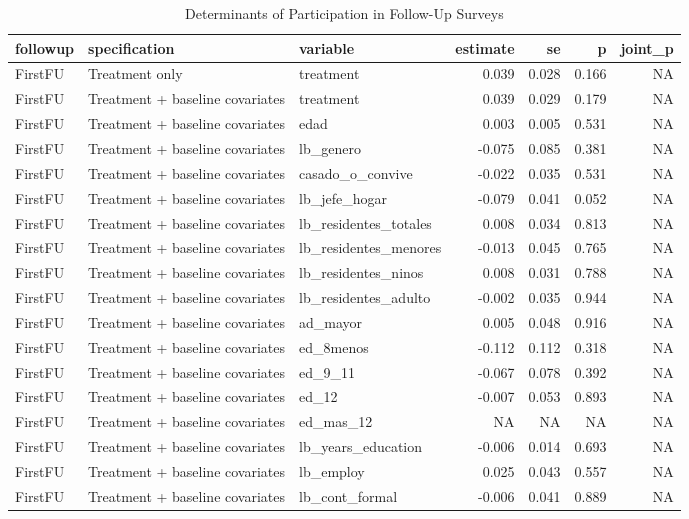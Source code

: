 \begin{table}

\caption{Determinants of Participation in Follow-Up Surveys}
\centering
\begin{tabular}[t]{lllrrrr}
\toprule
followup & specification & variable & estimate & se & p & joint\_p\\
\midrule
FirstFU & Treatment only & treatment & 0.039 & 0.028 & 0.166 & NA\\
FirstFU & Treatment + baseline covariates & treatment & 0.039 & 0.029 & 0.179 & NA\\
FirstFU & Treatment + baseline covariates & edad & 0.003 & 0.005 & 0.531 & NA\\
FirstFU & Treatment + baseline covariates & lb\_genero & -0.075 & 0.085 & 0.381 & NA\\
FirstFU & Treatment + baseline covariates & casado\_o\_convive & -0.022 & 0.035 & 0.531 & NA\\
\addlinespace
FirstFU & Treatment + baseline covariates & lb\_jefe\_hogar & -0.079 & 0.041 & 0.052 & NA\\
FirstFU & Treatment + baseline covariates & lb\_residentes\_totales & 0.008 & 0.034 & 0.813 & NA\\
FirstFU & Treatment + baseline covariates & lb\_residentes\_menores & -0.013 & 0.045 & 0.765 & NA\\
FirstFU & Treatment + baseline covariates & lb\_residentes\_ninos & 0.008 & 0.031 & 0.788 & NA\\
FirstFU & Treatment + baseline covariates & lb\_residentes\_adulto & -0.002 & 0.035 & 0.944 & NA\\
\addlinespace
FirstFU & Treatment + baseline covariates & ad\_mayor & 0.005 & 0.048 & 0.916 & NA\\
FirstFU & Treatment + baseline covariates & ed\_8menos & -0.112 & 0.112 & 0.318 & NA\\
FirstFU & Treatment + baseline covariates & ed\_9\_11 & -0.067 & 0.078 & 0.392 & NA\\
FirstFU & Treatment + baseline covariates & ed\_12 & -0.007 & 0.053 & 0.893 & NA\\
FirstFU & Treatment + baseline covariates & ed\_mas\_12 & NA & NA & NA & NA\\
\addlinespace
FirstFU & Treatment + baseline covariates & lb\_years\_education & -0.006 & 0.014 & 0.693 & NA\\
FirstFU & Treatment + baseline covariates & lb\_employ & 0.025 & 0.043 & 0.557 & NA\\
FirstFU & Treatment + baseline covariates & lb\_cont\_formal & -0.006 & 0.041 & 0.889 & NA\\

\end{tabular}
\end{table}
